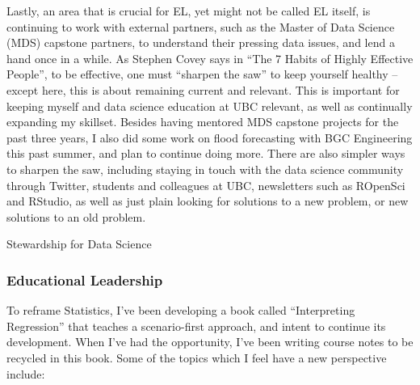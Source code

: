 \documentclass[]{article}
\begin{document}
Lastly, an area that is crucial for EL, yet might not be called EL itself, is continuing to work with external partners, such as the Master of Data Science (MDS) capstone partners, to understand their pressing data issues, and lend a hand once in a while. As Stephen Covey says in ``The 7 Habits of Highly Effective People'', to be effective, one must ``sharpen the saw'' to keep yourself healthy -- except here, this is about remaining current and relevant. This is important for keeping myself and data science education at UBC relevant, as well as continually expanding my skillset. Besides having mentored MDS capstone projects for the past three years, I also did some work on flood forecasting with BGC Engineering this past summer, and plan to continue doing more. There are also simpler ways to sharpen the saw, including staying in touch with the data science community through Twitter, students and colleagues at UBC, newsletters such as ROpenSci and RStudio, as well as just plain looking for solutions to a new problem, or new solutions to an old problem.

Stewardship for Data Science

\hypertarget{educational-leadership}{%
\subsubsection{Educational Leadership}\label{educational-leadership}}

To reframe Statistics, I've been developing a book called ``Interpreting Regression'' that teaches a scenario-first approach, and intent to continue its development. When I've had the opportunity, I've been writing course notes to be recycled in this book. Some of the topics which I feel have a new perspective include:
\end{document}
